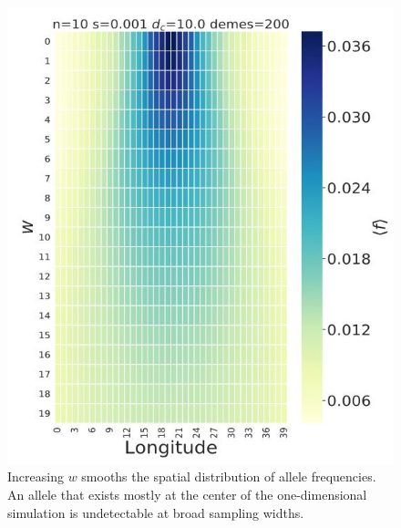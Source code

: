\begin{figure}[h]
    \centering
    \includegraphics[scale=0.8]{img/sampling_heatmap.JPG}
    \caption{Increasing $w$ smooths the spatial distribution of allele frequencies. An allele that exists mostly at the center of the one-dimensional simulation is undetectable at broad sampling widths.}
    \label{fig:sampling_w}
\end{figure}


